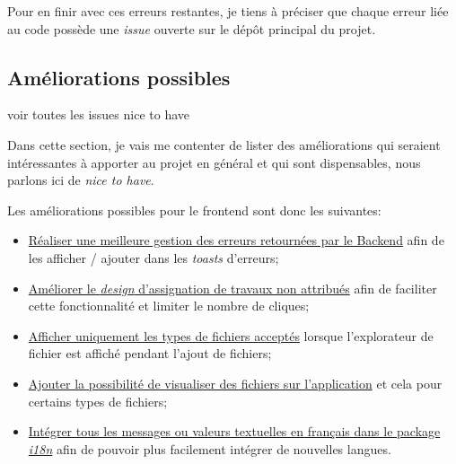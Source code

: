 \documentclass[
    iai, %
    il, %
]{heig-tb}
\begin{document}
Pour en finir avec ces erreurs restantes, je tiens à préciser que chaque erreur liée au code possède une \emph{issue} ouverte sur le dépôt principal du projet.

\subsection{Améliorations possibles}
voir toutes les issues nice to have

Dans cette section, je vais me contenter de lister des améliorations qui seraient intéressantes à apporter au projet en général et qui sont dispensables, nous parlons ici de \emph{nice to have}.

Les améliorations possibles pour le \Gls{frontend} sont donc les suivantes:
\begin{itemize}
    \item \href{https://github.com/heig-fablab/fablab-manager/issues/78}{Réaliser une meilleure gestion des erreurs retournées par le Backend} afin de les afficher / ajouter dans les \emph{toasts} d'erreurs;
    \item \href{https://github.com/heig-fablab/fablab-manager/issues/141}{Améliorer le \emph{design} d'assignation de travaux non attribués} afin de faciliter cette fonctionnalité et limiter le nombre de cliques;
    \item \href{https://github.com/heig-fablab/fablab-manager/issues/156}{Afficher uniquement les types de fichiers acceptés} lorsque l'explorateur de fichier est affiché pendant l'ajout de fichiers;
    \item \href{https://github.com/heig-fablab/fablab-manager/issues/122}{Ajouter la possibilité de visualiser des fichiers sur l'application} et cela pour certains types de fichiers;
    \item \href{https://github.com/heig-fablab/fablab-manager/issues/74}{Intégrer tous les messages ou valeurs textuelles en français dans le package \emph{i18n}} afin de pouvoir plus facilement intégrer de nouvelles langues.
\end{itemize}
\end{document}
